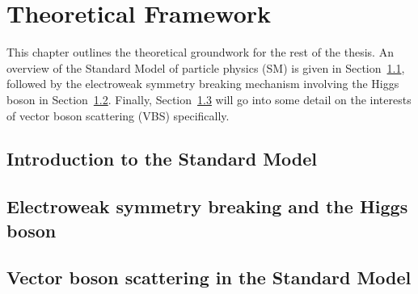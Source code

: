 \chapter[Theoretical Framework][Theoretical Framework]{Theoretical Framework} \label{ch:theory}

This chapter outlines the theoretical groundwork for the rest of the thesis.
An overview of the Standard Model of particle physics (SM) is given in Section~\ref{sec:theory_sm}, followed by the electroweak symmetry breaking mechanism involving the Higgs boson in Section~\ref{sec:theory_higgs}.
Finally, Section~\ref{sec:theory_vbs} will go into some detail on the interests of vector boson scattering (VBS) specifically.

\section{Introduction to the Standard Model} \label{sec:theory_sm}


\section{Electroweak symmetry breaking and the Higgs boson} \label{sec:theory_higgs}


%

\section{Vector boson scattering in the Standard Model}\label{sec:theory_vbs}

